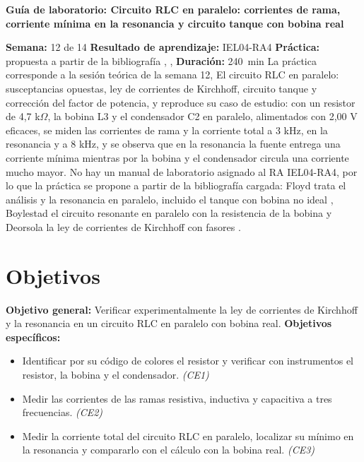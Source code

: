 \documentclass[12pt]{article}
\begin{document}
\nocite{ref1,ref2,ref3}

\datosguia
\lineablanco

{\centering\bfseries Guía de laboratorio: Circuito RLC en paralelo: corrientes de rama, corriente mínima en la resonancia y circuito tanque con bobina real\par}
\lineablanco
\textbf{Semana:} 12 de 14 \quad \textbf{Resultado de aprendizaje:} IEL04-RA4 \quad \textbf{Práctica:} propuesta a partir de la bibliografía \cite{ref1}, \cite{ref2}, \cite{ref3} \quad \textbf{Duración:} \SI{240}{\minute}
\lineablanco
La práctica corresponde a la sesión teórica de la semana 12, \guillemotleft{}El circuito RLC en paralelo: susceptancias opuestas, ley de corrientes de Kirchhoff, circuito tanque y corrección del factor de potencia\guillemotright{}, y reproduce su caso de estudio: con un resistor de 4,7 k\ensuremath{\Omega}, la bobina L3 y el condensador C2 en paralelo, alimentados con 2,00 V eficaces, se miden las corrientes de rama y la corriente total a 3 kHz, en la resonancia y a 8 kHz, y se observa que en la resonancia la fuente entrega una corriente mínima mientras por la bobina y el condensador circula una corriente mucho mayor. No hay un manual de laboratorio asignado al RA IEL04-RA4, por lo que la práctica se propone a partir de la bibliografía cargada: Floyd trata el análisis y la resonancia en paralelo, incluido el tanque con bobina no ideal \cite{ref1}, Boylestad el circuito resonante en paralelo con la resistencia de la bobina \cite{ref2} y Deorsola la ley de corrientes de Kirchhoff con fasores \cite{ref3}.

\section{Objetivos}\label{sec:objetivos}
\textbf{Objetivo general:} Verificar experimentalmente la ley de corrientes de Kirchhoff y la resonancia en un circuito RLC en paralelo con bobina real.
\lineablanco
\textbf{Objetivos específicos:}
\begin{itemize}
  \item Identificar por su código de colores el resistor y verificar con instrumentos el resistor, la bobina y el condensador. \emph{(CE1)}
  \item Medir las corrientes de las ramas resistiva, inductiva y capacitiva a tres frecuencias. \emph{(CE2)}
  \item Medir la corriente total del circuito RLC en paralelo, localizar su mínimo en la resonancia y compararlo con el cálculo con la bobina real. \emph{(CE3)}
\end{itemize}
\end{document}
